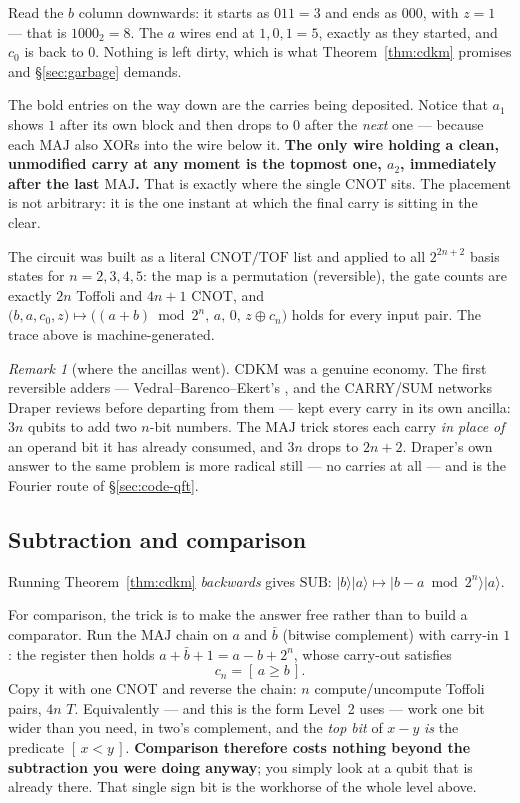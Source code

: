 \documentclass[11pt]{article}
\renewcommand{\ket}[1]{\lvert #1 \rangle}
\newcommand{\MAJ}{\mathrm{MAJ}}
\newcommand{\SUB}{\mathrm{SUB}}
\newcommand{\TOF}{\mathrm{TOF}}
\newcommand{\CNOT}{\mathrm{CNOT}}
\theoremstyle{plain}
\theoremstyle{remark}
\newtheorem*{remark}{Remark}
\begin{document}
\noindent
Read the $b$ column downwards: it starts as $011=3$ and ends as $000$, with $z=1$ --- that is
$1000_2=8$. The $a$ wires end at $1,0,1=5$, exactly as they started, and $c_0$ is back to $0$.
Nothing is left dirty, which is what Theorem~\ref{thm:cdkm} promises and \S\ref{sec:garbage}
demands.

\smallskip\noindent
The bold entries on the way down are the carries being deposited. Notice that $a_1$ shows $1$ after
its own block and then drops to $0$ after the \emph{next} one --- because each $\MAJ$ also XORs into
the wire below it. \textbf{The only wire holding a clean, unmodified carry at any moment is the
topmost one, $a_2$, immediately after the last $\MAJ$.} That is exactly where the single CNOT sits.
The placement is not arbitrary: it is the one instant at which the final carry is sitting in the
clear.

\begin{keybox}[title={Verified}]
The circuit was built as a literal $\CNOT/\TOF$ list and applied to all $2^{2n+2}$ basis states for
$n=2,3,4,5$: the map is a permutation (reversible), the gate counts are exactly $2n$ Toffoli and
$4n{+}1$ CNOT, and $\big(b,a,c_0,z\big)\mapsto\big((a{+}b)\bmod 2^n,\,a,\,0,\,z\oplus c_n\big)$
holds for every input pair. The trace above is machine-generated.
\end{keybox}

\begin{remark}[where the ancillas went]
CDKM was a genuine economy. The first reversible adders --- Vedral--Barenco--Ekert's \cite{vbe},
and the CARRY/SUM networks Draper \cite{draper} reviews before departing from them --- kept every
carry in its own ancilla: $3n$ qubits to add two $n$-bit numbers. The $\MAJ$ trick stores each
carry \emph{in place of} an operand bit it has already consumed, and $3n$ drops to $2n+2$.
Draper's own answer to the same problem is more radical still --- no carries at all --- and is the
Fourier route of \S\ref{sec:code-qft}.
\end{remark}

\subsection{Subtraction and comparison}
Running Theorem~\ref{thm:cdkm} \emph{backwards} gives $\SUB$: $\ket b\ket a\mapsto\ket{b-a\bmod2^n}\ket a$.

For comparison, the trick is to make the answer free rather than to build a comparator. Run the
$\MAJ$ chain on $a$ and $\bar b$ (bitwise complement) with carry-in $1$: the register then holds
$a+\bar b+1=a-b+2^n$, whose carry-out satisfies
\begin{equation}\label{eq:cmp}
c_n=[\,a\ge b\,].
\end{equation}
Copy it with one CNOT and reverse the chain: $n$ compute/uncompute Toffoli pairs, $4n$ $T$.
Equivalently --- and this is the form Level~2 uses --- work one bit wider than you need, in two's
complement, and the \emph{top bit} of $x-y$ \emph{is} the predicate $[\,x<y\,]$. \textbf{Comparison
therefore costs nothing beyond the subtraction you were doing anyway}; you simply look at a qubit
that is already there. That single sign bit is the workhorse of the whole level above.
\end{document}
